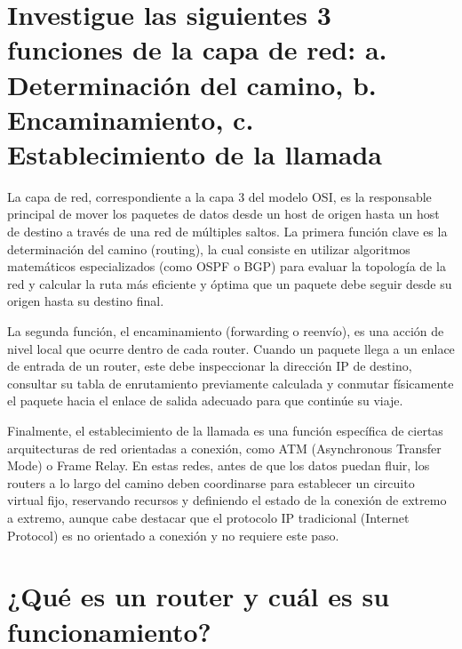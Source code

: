 \documentclass[a4paper,12pt]{article}
\begin{document}
\renewcommand{\footrulewidth}{0.4pt}  %

\setcounter{page}{1}

\tableofcontents


\newpage

\section{Investigue las siguientes 3 funciones de la capa de red: a. Determinación del camino, b. Encaminamiento, c. Establecimiento de la llamada}

La capa de red, correspondiente a la capa 3 del modelo OSI, es la responsable principal de mover los paquetes de datos desde un host de origen hasta un host de destino a través de una red de múltiples saltos. La primera función clave es la determinación del camino (routing), la cual consiste en utilizar algoritmos matemáticos especializados (como OSPF o BGP) para evaluar la topología de la red y calcular la ruta más eficiente y óptima que un paquete debe seguir desde su origen hasta su destino final.

La segunda función, el encaminamiento (forwarding o reenvío), es una acción de nivel local que ocurre dentro de cada router. Cuando un paquete llega a un enlace de entrada de un router, este debe inspeccionar la dirección IP de destino, consultar su tabla de enrutamiento previamente calculada y conmutar físicamente el paquete hacia el enlace de salida adecuado para que continúe su viaje.

Finalmente, el establecimiento de la llamada es una función específica de ciertas arquitecturas de red orientadas a conexión, como ATM (Asynchronous Transfer Mode) o Frame Relay. En estas redes, antes de que los datos puedan fluir, los routers a lo largo del camino deben coordinarse para establecer un circuito virtual fijo, reservando recursos y definiendo el estado de la conexión de extremo a extremo, aunque cabe destacar que el protocolo IP tradicional (Internet Protocol) es no orientado a conexión y no requiere este paso.

\section{¿Qué es un router y cuál es su funcionamiento?}
\end{document}
